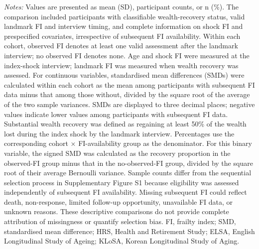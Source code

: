 \begin{landscape}
\noindent\parbox{\linewidth}{\raggedright\fontsize{9}{11}\selectfont\textit{Notes:} Values are presented as mean (SD), participant counts, or n (\%). The comparison included participants with classifiable wealth-recovery status, valid landmark FI and interview timing, and complete information on shock FI and prespecified covariates, irrespective of subsequent FI availability. Within each cohort, observed FI denotes at least one valid assessment after the landmark interview; no observed FI denotes none. Age and shock FI were measured at the index-shock interview; landmark FI was measured when wealth recovery was assessed. For continuous variables, standardised mean differences (SMDs) were calculated within each cohort as the mean among participants with subsequent FI data minus that among those without, divided by the square root of the average of the two sample variances. SMDs are displayed to three decimal places; negative values indicate lower values among participants with subsequent FI data. Substantial wealth recovery was defined as regaining at least 50\% of the wealth lost during the index shock by the landmark interview. Percentages use the corresponding cohort × FI-availability group as the denominator. For this binary variable, the signed SMD was calculated as the recovery proportion in the observed-FI group minus that in the no-observed-FI group, divided by the square root of their average Bernoulli variance. Sample counts differ from the sequential selection process in Supplementary Figure S1 because eligibility was assessed independently of subsequent FI availability. Missing subsequent FI could reflect death, non-response, limited follow-up opportunity, unavailable FI data, or unknown reasons. These descriptive comparisons do not provide complete attribution of missingness or quantify selection bias. FI, frailty index; SMD, standardised mean difference; HRS, Health and Retirement Study; ELSA, English Longitudinal Study of Ageing; KLoSA, Korean Longitudinal Study of Aging.}
\end{landscape}
